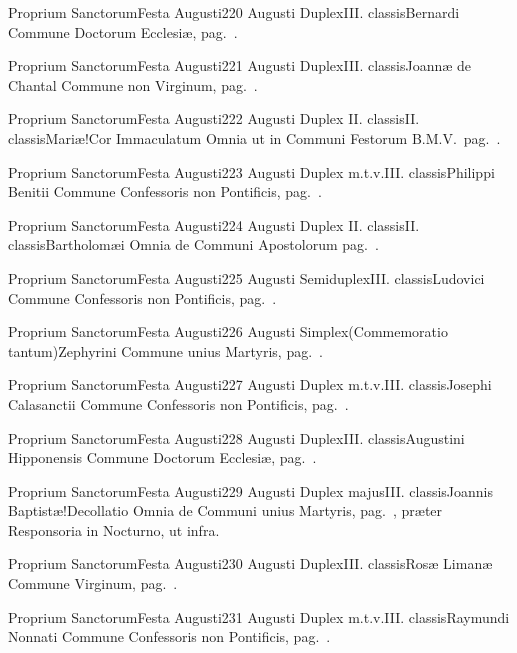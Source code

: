 \documentclass[nocturnale-romanum.tex]{subfiles}
\begin{document}
	{Proprium Sanctorum}{Festa Augusti}{2}{20 Augusti}
	{Duplex}{III. classis}{Bernardi}
	{Commune Doctorum Ecclesiæ, pag.\ \pageref{M-CODO}.}
	{}

	{Proprium Sanctorum}{Festa Augusti}{2}{21 Augusti}
	{Duplex}{III. classis}{Joannæ de Chantal}
	{Commune non Virginum, pag.\ \pageref{M-MU}.}
	{}

	{Proprium Sanctorum}{Festa Augusti}{2}{22 Augusti}
	{Duplex II. classis}{II. classis}{Mariæ!Cor Immaculatum}
	{Omnia ut in Communi Festorum B.M.V.\ pag.\ \pageref{M-CBMV}.}
	{}

	{Proprium Sanctorum}{Festa Augusti}{2}{23 Augusti}
	{Duplex m.t.v.}{III. classis}{Philippi Benitii}
	{Commune Confessoris non Pontificis, pag.\ \pageref{M-CONP}.}
	{}

	{Proprium Sanctorum}{Festa Augusti}{2}{24 Augusti}
	{Duplex II. classis}{II. classis}{Bartholomæi}
	{Omnia de Communi Apostolorum pag.\ \pageref{M-APEX}.}
	{}

	{Proprium Sanctorum}{Festa Augusti}{2}{25 Augusti}
	{Semiduplex}{III. classis}{Ludovici}
	{Commune Confessoris non Pontificis, pag.\ \pageref{M-CONP}.}
	{}

	{Proprium Sanctorum}{Festa Augusti}{2}{26 Augusti}
	{Simplex}{(Commemoratio tantum)}{Zephyrini}
	{Commune unius Martyris, pag.\ \pageref{M-UMEX}.}
	{}

	{Proprium Sanctorum}{Festa Augusti}{2}{27 Augusti}
	{Duplex m.t.v.}{III. classis}{Josephi Calasanctii}
	{Commune Confessoris non Pontificis, pag.\ \pageref{M-CONP}.}
	{}

	{Proprium Sanctorum}{Festa Augusti}{2}{28 Augusti}
	{Duplex}{III. classis}{Augustini Hipponensis}
	{Commune Doctorum Ecclesiæ, pag.\ \pageref{M-CODO}.}
	{}

	{Proprium Sanctorum}{Festa Augusti}{2}{29 Augusti}
	{Duplex majus}{III. classis}{Joannis Baptistæ!Decollatio}
	{Omnia de Communi unius Martyris, pag.\ \pageref{M-UMEX}, præter Responsoria in  Nocturno, ut infra.}
	{}
\tedeumrubric

	{Proprium Sanctorum}{Festa Augusti}{2}{30 Augusti}
	{Duplex}{III. classis}{Rosæ Limanæ}
	{Commune Virginum, pag.\ \pageref{M-MU}.}
	{}

	{Proprium Sanctorum}{Festa Augusti}{2}{31 Augusti}
	{Duplex m.t.v.}{III. classis}{Raymundi Nonnati}
	{Commune Confessoris non Pontificis, pag.\ \pageref{M-CONP}.}
	{}
\end{document}
